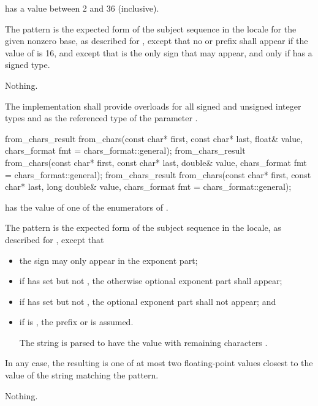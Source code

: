 \begin{itemdescr}
\pnum
\requires {} has a value between 2 and 36 (inclusive).

\pnum
\effects The pattern is the expected form of the subject sequence
in the  locale
for the given nonzero base,
as described for ,
except that no  or  prefix shall appear
if the value of  is 16,
and except that 
is the only sign that may appear,
and only if  has a signed type.

\pnum
\throws Nothing.

\pnum
\remarks
The implementation shall provide overloads
for all signed and unsigned integer types
and 
as the referenced type of the parameter .
\end{itemdescr}

%
\begin{itemdecl}
from_chars_result from_chars(const char* first, const char* last, float& value,
                             chars_format fmt = chars_format::general);
from_chars_result from_chars(const char* first, const char* last, double& value,
                             chars_format fmt = chars_format::general);
from_chars_result from_chars(const char* first, const char* last, long double& value,
                             chars_format fmt = chars_format::general);
\end{itemdecl}

\begin{itemdescr}
\pnum
\requires {} has the value of
one of the enumerators of .

\pnum
\effects The pattern is the expected form of the subject sequence
in the  locale,
as described for ,
except that
\begin{itemize}
\item
the sign  may only appear in the exponent part;
\item
if  has  set
but not ,
the otherwise optional exponent part shall appear;
\item
if  has  set
but not ,
the optional exponent part shall not appear; and
\item
if  is ,
the prefix  or  is assumed.
\begin{example}
The string 
is parsed to have the value
with remaining characters .
\end{example}
\end{itemize}
In any case, the resulting  is one of
at most two floating-point values
closest to the value of the string matching the pattern.

\pnum
\throws Nothing.
\end{itemdescr}

